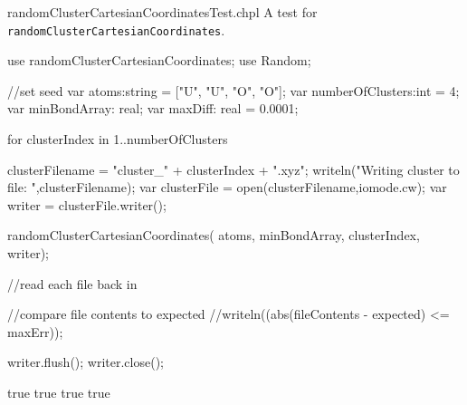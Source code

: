 \begin{chapelexample}{randomClusterCartesianCoordinatesTest.chpl}
  A test for \lstinline{randomClusterCartesianCoordinates}. 
  \begin{chapelpre}
  \end{chapelpre}
  \begin{chapel}
use randomClusterCartesianCoordinates;
use Random;
  
//set seed
var atoms:string = ["U", "U", "O", "O"];
var numberOfClusters:int = 4; 
var minBondArray: real; 
var maxDiff: real = 0.0001;

for clusterIndex in 1..numberOfClusters {
  clusterFilename = "cluster_" + clusterIndex + ".xyz";
  writeln("Writing cluster to file: ",clusterFilename);
  var clusterFile = open(clusterFilename,iomode.cw);
  var writer = clusterFile.writer();

  randomClusterCartesianCoordinates(
    atoms,
    minBondArray,
    clusterIndex,
    writer);

    //read each file back in

    //compare file contents to expected
  //writeln((abs(fileContents - expected) <= maxErr));

  writer.flush(); 
  writer.close();
}
\end{chapel}
\begin{chapelpost}
\end{chapelpost}
\begin{chapeloutput}
true
true
true
true
\end{chapeloutput}
\end{chapelexample}


